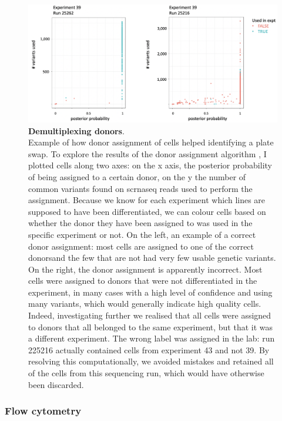 \begin{figure}[h]
\centering
\includegraphics[width=14cm]{Chapter4/Fig/cardelino_example.png}
\caption[Demultiplexing donors]{\textbf{Demultiplexing donors}.\\
Example of how donor assignment of cells helped identifying a plate swap.
To explore the results of the donor assignment algorithm \cite{mccarthy2020cardelino}, I plotted cells along two axes: on the x axis, the posterior probability of being assigned to a certain donor, on the y the number of common variants found on \gls{scrnaseq} reads used to perform the assignment.
Because we know for each experiment which lines are supposed to have been differentiated, we can colour cells based on whether the donor they have been assigned to was used in the specific experiment or not.
On the left, an example of a correct donor assignment: most cells are assigned to one of the correct donors\footnotemark and the few that are not had very few usable genetic variants.
On the right, the donor assignment is apparently incorrect.
Most cells were assigned to donors that were not differentiated in the experiment, in many cases with a high level of confidence and using many variants, which would generally indicate high quality cells.
Indeed, investigating further we realised that all cells were assigned to donors that all belonged to the same experiment, but that it was a different experiment.
The wrong label was assigned in the lab: run 225216 actually contained cells from experiment 43 and not 39.
By resolving this computationally, we avoided mistakes and retained all of the cells from this sequencing run, which would have otherwise been discarded.}
\label{fig:plate_swap}
\end{figure}


\subsubsection{Flow cytometry}

